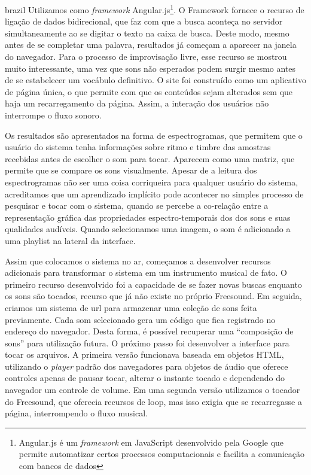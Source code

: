 \begin{otherlanguage*}{brazil}
Utilizamos como \emph{framework} Angular.js\footnote{Angular.js é um \emph{framework} em JavaScript desenvolvido pela Google que permite automatizar certos processos computacionais e facilita a comunicação com bancos de dados}. O Framework fornece o recurso de ligação de dados bidirecional, que faz com que a busca aconteça no servidor simultaneamente ao se digitar o texto na caixa de busca. Deste modo, mesmo antes de se completar uma palavra, resultados já começam a aparecer na janela do navegador. Para o processo de improvisação livre, esse recurso se mostrou muito interessante, uma vez que sons não esperados podem surgir mesmo antes de se estabelecer um vocábulo definitivo. O site foi construído como um aplicativo de página única, o que permite com que os conteúdos sejam alterados sem que haja um recarregamento da página\cite{Jadhav}. Assim, a interação dos usuários não interrompe o fluxo sonoro.

Os resultados são apresentados na forma de espectrogramas, que permitem que o usuário do sistema tenha informações sobre ritmo e timbre das amostras recebidas antes de escolher o som para tocar. Aparecem como uma matriz, que permite que se compare os sons visualmente. Apesar de a leitura dos espectrogramas não ser uma coisa corriqueira para qualquer usuário do sistema, acreditamos que um aprendizado implícito pode acontecer no simples processo de pesquisar e tocar com o sistema, quando se percebe a co-relação entre a representação gráfica das propriedades espectro-temporais dos dos sons e suas qualidades audíveis. Quando selecionamos uma imagem, o som é adicionado a uma playlist na lateral da interface.

 Assim que colocamos o sistema no ar, começamos a desenvolver recursos adicionais para transformar o sistema em um instrumento musical de fato. O primeiro recurso desenvolvido foi a capacidade de se fazer novas buscas enquanto os sons são tocados, recurso que já não existe no próprio Freesound. Em seguida, criamos um sistema de url para armazenar uma coleção de sons feita previamente. Cada som selecionado gera um código que fica registrado no endereço do navegador. Desta forma, é possível recuperar uma ``composição de sons'' para utilização futura. O próximo passo foi desenvolver a interface para tocar os arquivos. A primeira versão funcionava baseada em objetos HTML, utilizando o \emph{player} padrão dos navegadores para objetos de áudio que oferece controles apenas de pausar tocar, alterar o instante tocado e dependendo do navegador um controle de volume. Em uma segunda versão utilizamos o tocador do Freesound, que oferecia recursos de loop, mas isso exigia que se recarregasse a página, interrompendo o fluxo musical. 


\end{otherlanguage*}
